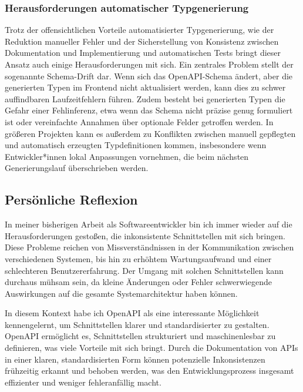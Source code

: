 \subsubsection{Herausforderungen automatischer Typgenerierung}

Trotz der offensichtlichen Vorteile automatisierter Typgenerierung, wie der Reduktion manueller Fehler
und der Sicherstellung von Konsistenz zwischen Dokumentation und Implementierung und automatischen Tests\cite{9159071}
bringt dieser Ansatz auch einige Herausforderungen mit sich. 
Ein zentrales Problem stellt der sogenannte Schema-Drift dar.\cite{Kromerm}
Wenn sich das OpenAPI-Schema ändert, aber die generierten Typen im Frontend nicht aktualisiert werden, 
kann dies zu schwer auffindbaren Laufzeitfehlern führen. 
Zudem besteht bei generierten Typen die Gefahr einer Fehlinferenz, 
etwa wenn das Schema nicht präzise genug formuliert ist oder vereinfachte Annahmen über optionale Felder getroffen werden.
In größeren Projekten kann es außerdem zu Konflikten zwischen manuell gepflegten und automatisch erzeugten Typdefinitionen kommen,
insbesondere wenn Entwickler*innen lokal Anpassungen vornehmen, 
die beim nächsten Generierungslauf überschrieben werden. 

\subsection{Persönliche Reflexion}

In meiner bisherigen Arbeit als Softwareentwickler bin ich immer wieder auf die Herausforderungen gestoßen,
die inkonsistente Schnittstellen mit sich bringen. 
Diese Probleme reichen von Missverständnissen in der Kommunikation zwischen verschiedenen Systemen, 
bis hin zu erhöhtem Wartungsaufwand und einer schlechteren Benutzererfahrung. 
Der Umgang mit solchen Schnittstellen kann durchaus mühsam sein, 
da kleine Änderungen oder Fehler schwerwiegende Auswirkungen auf die gesamte Systemarchitektur haben können.

In diesem Kontext habe ich OpenAPI als eine interessante Möglichkeit kennengelernt, 
um Schnittstellen klarer und standardisierter zu gestalten. 
OpenAPI ermöglicht es, Schnittstellen strukturiert und maschinenlesbar zu definieren, was viele Vorteile mit sich bringt.
Durch die Dokumentation von APIs in einer klaren, standardisierten Form können potenzielle Inkonsistenzen frühzeitig erkannt 
und behoben werden, was den Entwicklungsprozess insgesamt effizienter und weniger fehleranfällig macht.

